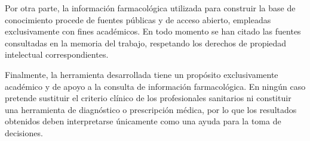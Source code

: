Por otra parte, la información farmacológica utilizada para construir la base de conocimiento procede de fuentes públicas y de acceso abierto, empleadas exclusivamente con fines académicos. En todo momento se han citado las fuentes consultadas en la memoria del trabajo, respetando los derechos de propiedad intelectual correspondientes.

Finalmente, la herramienta desarrollada tiene un propósito exclusivamente académico y de apoyo a la consulta de información farmacológica. En ningún caso pretende sustituir el criterio clínico de los profesionales sanitarios ni constituir una herramienta de diagnóstico o prescripción médica, por lo que los resultados obtenidos deben interpretarse únicamente como una ayuda para la toma de decisiones.